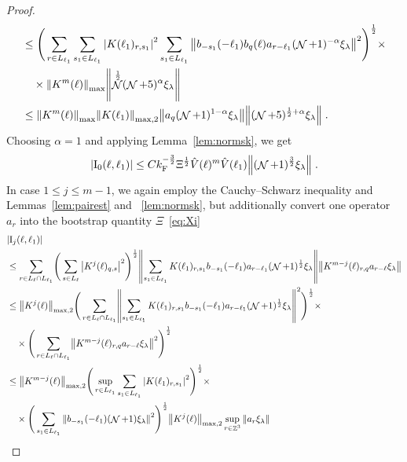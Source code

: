 \documentclass[12pt,a4paper]{article}
\numberwithin{equation}{section}
\newcommand{\1}{\mathbb{I}}
\newcommand{\F}{\mathrm{F}}
\newcommand{\I}{\mathrm{I}}
\DeclareMathOperator{\Z}{\mathbb{Z}}
\DeclareMathOperator{\NN}{\mathcal{N}}
\newcommand{\half}{\frac{1}{2}}
\theoremstyle{plain}
\theoremstyle{definition}
\theoremstyle{remark}
\theoremstyle{plain}
\theoremstyle{definition}
\theoremstyle{remark}
\begin{document}
\begin{proof}
\begin{align}
    &\leq \Bigg( \sum\limits_{r \in L_{\ell_1}}  \sum\limits_{s_1 \in L_{\ell_1}}\abs{K(\ell_1)_{r,s_1}}^2 \sum\limits_{s_1 \in L_{\ell_1}} \norm{ b_{-s_1}(-\ell_1) b_{q}(\ell) a_{r-\ell_1} (\NN+1)^{-\alpha}\xi_\lambda}^2\Bigg)^\half \times\nonumber\\
    & \quad \times \norm{K^{m}(\ell)}_{\max} \norm{ \NN^\half(\NN+5)^{\alpha}\xi_\lambda } \nonumber\\
    &\leq \norm{  K^{m}(\ell)}_{\max}  \norm{K(\ell_1)}_{\mathrm{max,2}}   \norm{   a_{q}(\NN+1)^{1-\alpha}\xi_\lambda} \norm{  (\NN+5)^{\half+\alpha}\xi_\lambda } \nonumber \;.\\
\end{align}
Choosing $\alpha = 1$ and applying Lemma~\ref{lem:normsk}, we get
\begin{equation}
	 |\I_0(\ell, \ell_1)|
	 \leq C k_{\F}^{-\frac{3}{2}} \Xi^\half
	 	\hat{V}(\ell)^m
	 	\hat{V}(\ell_1)
	 	\norm { (\NN+1)^{\frac{3}{2}} \xi_\lambda } \;. \label{eq:estEQ1111} 
\end{equation}
In case $ 1 \le j \le m-1 $, we again employ the Cauchy--Schwarz inequality and Lemmas~\ref{lem:pairest} and ~\ref{lem:normsk}, but additionally convert one operator $ a_r $ into the bootstrap quantity $ \Xi $~\eqref{eq:Xi}
\begin{align}
	&|\I_j(\ell, \ell_1)| \nonumber\\
	&\leq \sum\limits_{r\in L_{\ell} \cap L_{\ell_1}}\! \Bigg( \sum\limits_{s \in L_\ell}\abs{K^{j}(\ell)_{q,s}}^2\Bigg)^\half \norm{ \sum\limits_{ s_1 \in L_{\ell_1}}  K(\ell_1)_{r,s_1} b_{-s_1}(-\ell_1)  a_{r-\ell_1}(\NN+1)^\half\xi_\lambda}
	\norm{  K^{m-j}(\ell)_{r,q} a_{r-\ell} \xi_\lambda } \nonumber\\
	&\leq \norm{K^{j}(\ell)}_{\mathrm{max,2}} \Bigg( \sum\limits_{r\in L_{\ell} \cap L_{\ell_1}}\! \norm{ \sum\limits_{ s_1 \in L_{\ell_1}}  K(\ell_1)_{r,s_1} b_{-s_1}(-\ell_1)  a_{r-\ell_1}(\NN+1)^\half\xi_\lambda} ^2\Bigg)^\half \times\nonumber\\
	&\quad \times \Bigg( \sum\limits_{r\in L_{\ell} \cap L_{\ell_1}}\!\norm{  K^{m-j}(\ell)_{r,q} a_{r-\ell} \xi_\lambda }^2\Bigg)^\half \nonumber\\
	&\leq \norm{K^{m-j}(\ell)}_{\mathrm{max,2}}  \Bigg(\sup_{r \in L_{\ell_1}} \sum\limits_{ s_1 \in L_{\ell_1}}\abs{  K(\ell_1)_{r,s_1} }^2\Bigg)^\half \times \nonumber \\
	&\quad \times \Bigg(  \sum\limits_{ s_1 \in L_{\ell_1}}\norm{   b_{-s_1}(-\ell_1)  (\NN+1)\xi_\lambda} ^2\Bigg)^\half
	\norm{K^{j}(\ell)}_{\mathrm{max,2}}
	\sup_{r \in \Z^3}\norm{a_r\xi_\lambda} \nonumber\\

\end{align}
\end{proof}
\end{document}
